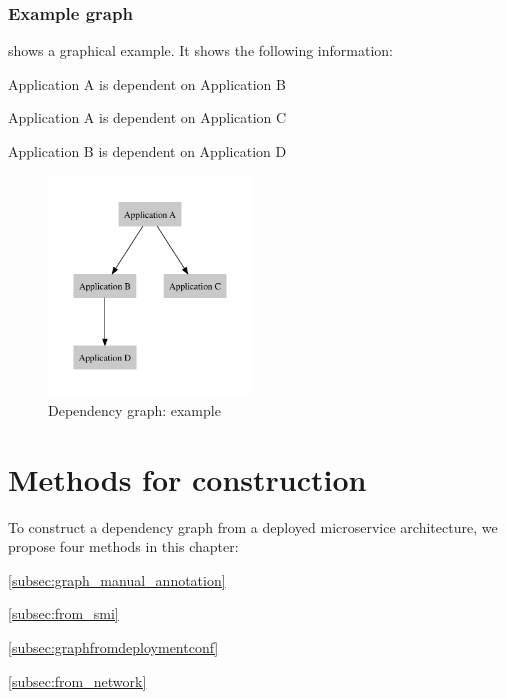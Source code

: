 \subsubsection{Example graph}

 shows a graphical example. It shows the following information:
\begin{titemize}
  \item Application A is dependent on Application B
  \item Application A is dependent on Application C
  \item Application B is dependent on Application D
\end{titemize}

\begin{figure}[h]
  \begin{center}
    \includegraphics[width=0.48\textwidth]{images/directed-graph-example.pdf}
  \end{center}
  \caption{Dependency graph: example}
  \label{fig:digraph_example}
\end{figure}

\vfill\clearpage

\section{Methods for construction}

To construct a dependency graph from a deployed microservice architecture, we propose four methods in this chapter:
\begin{titemize}
  \item[] {\small\ref{subsec:graph_manual_annotation} }
  \item[] {\small\ref{subsec:from_smi} }
  \item[] {\small\ref{subsec:graphfromdeploymentconf} }
  \item[] {\small\ref{subsec:from_network} }
\end{titemize}

